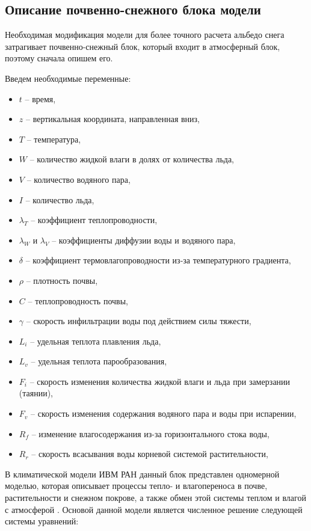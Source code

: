 \documentclass[a4paper, fontsize=14pt]{scrartcl}
\begin{document}
\subsection{Описание почвенно-снежного блока модели}

Необходимая модификация модели для более точного расчета альбедо снега затрагивает почвенно-снежный блок, который входит в атмосферный блок, поэтому сначала опишем его. 

Введем необходимые переменные:
\begin{itemize}
    \item $t$ -- время, 
    \item $z$ -- вертикальная координата, направленная вниз, 
    \item $T$ -- температура, 
    \item $W$ -- количество жидкой влаги в долях от количества льда, 
    \item $V$ -- количество водяного пара, 
    \item $I$ -- количество льда, 
    \item $\lambda_T$ -- коэффициент теплопроводности, 
    \item $\lambda_W$ и $\lambda_V$ -- коэффициенты диффузии воды и водяного пара, 
    \item $\delta$ -- коэффициент термовлагопроводности из-за  температурного градиента, 
    \item $\rho$ -- плотность почвы, 
    \item $C$ -- теплопроводность почвы, 
    \item $\gamma$ -- скорость инфильтрации воды под действием силы тяжести, 
    \item $L_i$ -- удельная теплота плавления льда, 
    \item $L_v$ -- удельная теплота парообразования, 
    \item $F_i$ -- скорость изменения количества жидкой влаги и льда при замерзании (таянии), 
    \item $F_v$ -- скорость изменения содержания водяного пара и воды при испарении, 
    \item $R_f$ -- изменение влагосодержания из-за горизонтального стока воды, 
    \item $R_r$ -- скорость всасывания воды корневой системой растительности,
\end{itemize} 

В климатической модели ИВМ РАН данный блок представлен одномерной моделью, которая описывает процессы тепло- и влагопереноса в почве, растительности и снежном покрове, а также обмен этой системы теплом и влагой с атмосферой \cite{Volodin1998, Volodina2000}. Основой данной модели является численное решение следующей системы уравнений:
\end{document}
